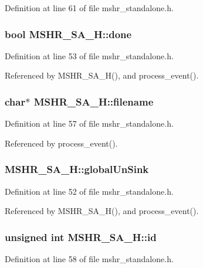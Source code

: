 Definition at line 61 of file mshr\_\-standalone.h.
\subsubsection[{done}]{\setlength{\rightskip}{0pt plus 5cm}bool {\bf MSHR\_\-SA\_\-H::done}}\label{classMSHR__SA__H_6d7fec251ceaf2600dcff5f3ae44e314}




Definition at line 53 of file mshr\_\-standalone.h.

Referenced by MSHR\_\-SA\_\-H(), and process\_\-event().
\subsubsection[{filename}]{\setlength{\rightskip}{0pt plus 5cm}char$\ast$ {\bf MSHR\_\-SA\_\-H::filename}}\label{classMSHR__SA__H_5457724c10446a03b152adba2571e825}




Definition at line 57 of file mshr\_\-standalone.h.

Referenced by process\_\-event().
\subsubsection[{globalUnSink}]{ {\bf MSHR\_\-SA\_\-H::globalUnSink}}\label{classMSHR__SA__H_eb20acb11d6f3fab9eba96a9c89b6067}




Definition at line 52 of file mshr\_\-standalone.h.

Referenced by MSHR\_\-SA\_\-H(), and process\_\-event().
\subsubsection[{id}]{\setlength{\rightskip}{0pt plus 5cm}unsigned int {\bf MSHR\_\-SA\_\-H::id}}\label{classMSHR__SA__H_05a9c1e47dbfe7cb388a3dd5515ff2ed}




Definition at line 58 of file mshr\_\-standalone.h.

